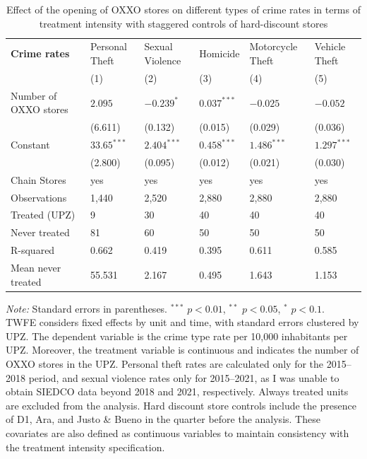 \documentclass[12pt]{article}
\begin{document}
\begin{table}[H]
\centering
\caption{Effect of the opening of OXXO stores on different types of crime rates in terms of treatment intensity with staggered controls of hard-discount stores}
\label{tab:resultados_regresion_intensitys_hd}
\small


\begin{tabularx}{\textwidth}{l C C C C C}
\hline\hline
\textbf{Crime rates} & Personal Theft & Sexual Violence & Homicide & Motorcycle Theft & Vehicle Theft \\
 & (1) & (2) & (3) & (4) & (5) \\
\hline 
Number of OXXO stores    & $2.095 $      & $-0.239^{*}$   & $0.037^{***}$ & $-0.025$      & $-0.052$\\
                         & (6.611)       & (0.132)       & (0.015)       & (0.029)       & (0.036) \\
Constant                 & $33.65^{***}$ & $2.404^{***}$ & $0.458^{***}$ & $1.486^{***}$ & $1.297^{***}$ \\
                         & (2.800)       & (0.095)       & (0.012)       & (0.021)       & (0.030) \\
\hline
Chain Stores       & yes    & yes   & yes   & yes   & yes \\
Observations       & 1,440  & 2,520 & 2,880 & 2,880 & 2,880 \\
Treated (UPZ)      & 9      & 30    & 40    & 40    & 40 \\
Never treated      & 81     & 60    & 50    & 50    & 50 \\
R-squared          & 0.662  & 0.419 & 0.395 & 0.611 & 0.585\\
Mean never treated & 55.531 & 2.167 & 0.495 & 1.643 & 1.153 \\
\hline\hline
\end{tabularx}

\vspace{0.5em}
\parbox{\textwidth}{\footnotesize
    \textit{Note:} Standard errors in parentheses. $^{***}$ $p<0.01$, $^{**}$ $p<0.05$, $^{*}$ $p<0.1$. \\
    TWFE considers fixed effects by unit and time, with standard errors clustered by UPZ. 
    The dependent variable is the crime type rate per 10,000 inhabitants per UPZ. 
    Moreover, the treatment variable is continuous and indicates the number of OXXO stores in the UPZ.
    Personal theft rates are calculated only for the 2015–2018 period, and sexual violence rates only for 2015–2021, as I was unable to obtain SIEDCO data beyond 2018 and 2021, respectively.
    Always treated units are excluded from the analysis.
    Hard discount store controls include the presence of D1, Ara, and Justo \& Bueno in the quarter before the analysis. 
    These covariates are also defined as continuous variables to maintain consistency with the treatment intensity specification.
}
\end{table}
\end{document}
